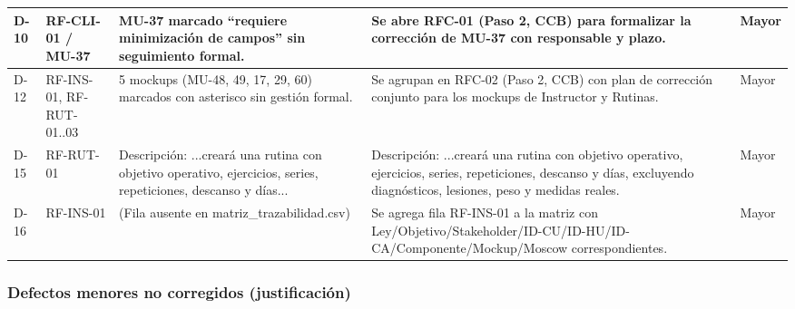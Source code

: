 \documentclass[11pt,a4paper]{article}
\begin{document}
\begin{longtable}{|C{0.9cm}|L{2.1cm}|L{5.0cm}|L{5.5cm}|C{1.6cm}|}
D-10 & RF-CLI-01 / MU-37 & MU-37 marcado ``requiere minimizaci\'on de campos'' sin seguimiento formal. & Se abre RFC-01 (Paso 2, CCB) para formalizar la correcci\'on de MU-37 con responsable y plazo. & Mayor \\ \hline
D-12 & RF-INS-01, RF-RUT-01..03 & 5 mockups (MU-48, 49, 17, 29, 60) marcados con asterisco sin gesti\'on formal. & Se agrupan en RFC-02 (Paso 2, CCB) con plan de correcci\'on conjunto para los mockups de Instructor y Rutinas. & Mayor \\ \hline
D-15 & RF-RUT-01 & Descripci\'on: ...crear\'a una rutina con objetivo operativo, ejercicios, series, repeticiones, descanso y d\'ias... & Descripci\'on: ...crear\'a una rutina con objetivo operativo, ejercicios, series, repeticiones, descanso y d\'ias, excluyendo diagn\'osticos, lesiones, peso y medidas reales. & Mayor \\ \hline
D-16 & RF-INS-01 & (Fila ausente en matriz\_\allowbreak trazabilidad.csv) & Se agrega fila RF-INS-01 a la matriz con Ley/Objetivo/Stakeholder/ID-CU/ID-HU/ID-CA/Componente/Mockup/Moscow correspondientes. & Mayor \\ \hline
\end{longtable}
\normalsize
 
\subsubsection*{Defectos menores no corregidos (justificaci\'on)}
 
\end{document}
